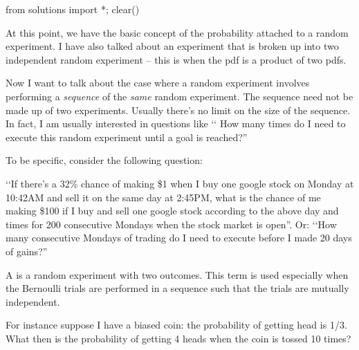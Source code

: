 \begin{python0}
from solutions import *; clear()
\end{python0}

At this point, we have the basic concept of the probability attached to
a random experiment.
I have also talked about an experiment that is broken up into two
independent random experiment -- this is when the pdf is a product of
two pdfs.

Now I want to talk about the case where
a random experiment involves
performing a \textit{sequence} of the \textit{same} random experiment.
The sequence need not be made up of two experiments.
Usually there's no limit on the size of the sequence.
In fact, I am usually interested in questions like
\lq\lq
How many times do I need to execute this random experiment
until a goal is reached?''

To be specific, consider the following question:

\lq\lq If there's a 32\% chance of making \$1 when I buy
one google stock on Monday at 10:42AM and sell it on the same day at 2:45PM,
what is the chance of me making \$100 if I buy and sell one google
stock according to the above day and times for 200 consecutive
Mondays when the stock market is open''.
Or:
\lq\lq How many consecutive Mondays of trading do I need to execute before
I made 20 days of gains?''


A 
is a random experiment with two outcomes.
This term is used especially when the Bernoulli trials
are performed in a sequence such that the trials are mutually
independent.

For instance suppose I have a biased coin: 
the probability of getting head is 1/3.
What then is the probability of getting 4 heads when the coin 
is tossed 10 times?

